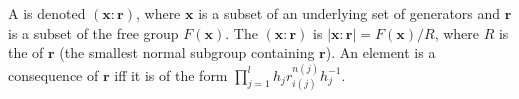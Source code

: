 A  is denoted $(\mathbf{x} : \mathbf{r})$, where $\mathbf{x}$ is a subset of an underlying set of generators and $\mathbf{r}$ is a subset of the free group $F(\mathbf{x})$. The  $(\mathbf{x} : \mathbf{r})$ is $|\mathbf{x} : \mathbf{r}| = F(\mathbf{x})/R$, where $R$ is the  of $\mathbf{r}$ (the smallest normal subgroup containing $\mathbf{r}$). An element is a consequence of $\mathbf{r}$ iff it is of the form $\prod_{j=1}^{l} h_j r_{i(j)}^{n(j)} h_j^{-1}$.
